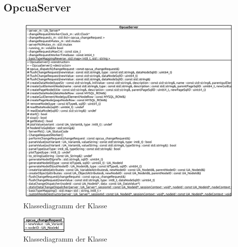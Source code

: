 \subsection{OpcuaServer}
\begin{figure}[ht]
  \centering
  \includegraphics[width=\textwidth]{content/hauptteil/umsetzungPoC/backend/uml/classesOfOverview/OpcuaServer.pdf}
  \caption{Klassediagramm der Klasse }
  \label{fig:backend:classDiag:OpcuaServer}
\end{figure}
\begin{figure}[ht]
  \centering
  \includegraphics[width=0.2\textwidth]{content/hauptteil/umsetzungPoC/backend/uml/classesOfOverview/opcua_changeRequest.pdf}
  \caption{Klassediagramm der Klasse }
  \label{fig:backend:classDiag:opcuaCR}
\end{figure}




